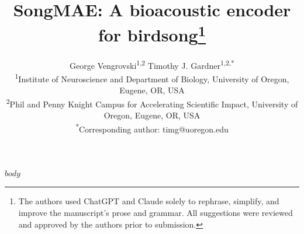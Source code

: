 \documentclass[10pt]{article}
\title{SongMAE: A bioacoustic encoder for birdsong\thanks{The authors used ChatGPT and Claude solely to rephrase, simplify, and improve the manuscript's prose and grammar. All suggestions were reviewed and approved by the authors prior to submission.}}
\author{\name George Vengrovski\textsuperscript{1,2} \quad Timothy J. Gardner\textsuperscript{1,2,*} \\
\addr \textsuperscript{1}Institute of Neuroscience and Department of Biology, University of Oregon, Eugene, OR, USA \\
\addr \textsuperscript{2}Phil and Penny Knight Campus for Accelerating Scientific Impact, University of Oregon, Eugene, OR, USA \\
\email \textsuperscript{*}Corresponding author: timg@uoregon.edu}
\begin{document}
\maketitle

$body$
\end{document}
